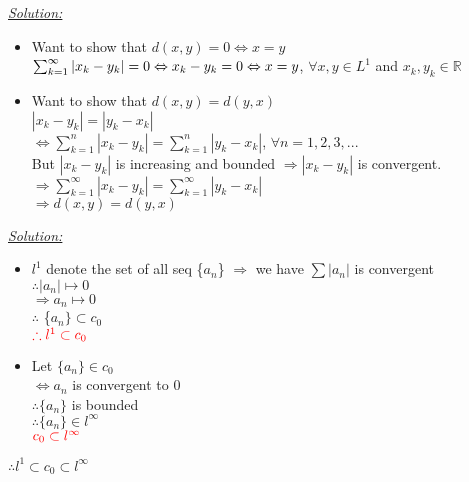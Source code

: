 \documentclass{amsbook}
\begin{document}
\begin{tcolorbox}[enhanced,attach boxed title to top center={yshift=-3mm,yshifttext=-1mm},
  colback=blue!5!white,colframe=blue!75!black,colbacktitle=red!80!black,
  title=Exercise 35.5:,fonttitle=\bfseries,
  boxed title style={size=small,colframe=red!50!black} ]
     \textit{\color{blue}\underline{Solution:}}
     \begin{itemize}
    \item Want to show that $d(x,y)=0\Leftrightarrow x=y$\\
    $\sum_{k=1}^{\infty}|x_k-y_k|=0\\ \Leftrightarrow x_k-y_k=0\\ \Leftrightarrow x=y$, $\forall x,y \in L^1$ 
    and $ x_k,y_k \in \mathbb{R}$ 
    \item Want to show that $d(x,y)=d(y,x)$\\
    $|x_k-y_k|=|y_k-x_k|$\\
    $\Leftrightarrow \sum_{k=1}^{n}|x_k-y_k|=\sum_{k=1}^{n}|y_k-x_k|$, $\forall n=1,2,3,...$\\
    But $|x_k-y_k|$ is increasing and bounded $\Rightarrow |x_k-y_k|$ is convergent. \\
    $\Rightarrow \sum_{k=1}^{\infty}|x_k-y_k|=\sum_{k=1}^{\infty}|y_k-x_k|$\\
    $\Rightarrow d(x,y)=d(y,x)$
\end{itemize}
\end{tcolorbox}



\begin{tcolorbox}[enhanced,attach boxed title to top center={yshift=-3mm,yshifttext=-1mm},
  colback=blue!5!white,colframe=blue!75!black,colbacktitle=red!80!black,
  title=Exercise 35.6:,fonttitle=\bfseries,
  boxed title style={size=small,colframe=red!50!black} ]
     \textit{\color{blue}\underline{Solution:}}
     \begin{itemize}
    \item $l^1$ denote the set of all seq \{$a_n$\}
    $\Rightarrow$ we have $\sum |a_n|$ is convergent\\
    $\therefore |a_n|\mapsto 0$\\
    $\Rightarrow a_n\mapsto 0$\\
    $\therefore $ \{$a_n\} \subset c_0$\\
    ${\color{red} \therefore l^1\subset c_0}$
    \item Let $\{ a_n\}\in c_0$\\
    $\Leftrightarrow a_n$ is convergent to $0$\\
    $\therefore \{a_n\}$ is bounded \\
    $\therefore \{ a_n\}\in l^\infty$\\
    ${\color{red}c_0\subset l^\infty}$
\end{itemize}
\begin{center}
    {\large \color{red} $\therefore l^1\subset c_0 \subset l^\infty$}
\end{center}
\end{tcolorbox}
\end{document}
